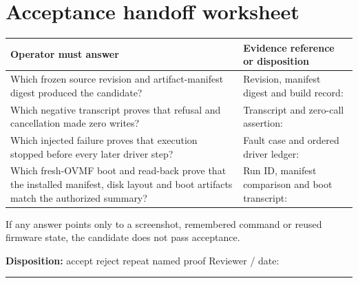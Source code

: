 \section{Acceptance handoff worksheet}
\begin{tabularx}{\linewidth}{@{}p{.40\linewidth}L@{}}
\toprule
\textbf{Operator must answer} & \textbf{Evidence reference or disposition}\\
\midrule
Which frozen source revision and artifact-manifest digest produced the candidate? & Revision, manifest digest and build record:\\[2.6em]
Which negative transcript proves that refusal and cancellation made zero writes? & Transcript and zero-call assertion:\\[2.6em]
Which injected failure proves that execution stopped before every later driver step? & Fault case and ordered driver ledger:\\[2.6em]
Which fresh-OVMF boot and read-back prove that the installed manifest, disk layout and boot artifacts match the authorized summary? & Run ID, manifest comparison and boot transcript:\\[2.6em]
\bottomrule
\end{tabularx}

If any answer points only to a screenshot, remembered command or reused
firmware state, the candidate does not pass acceptance.

\textbf{Disposition:}\quad
\fbox{\rule{0pt}{.8ex}\rule{.8ex}{0pt}} accept \qquad
\fbox{\rule{0pt}{.8ex}\rule{.8ex}{0pt}} reject \qquad
\fbox{\rule{0pt}{.8ex}\rule{.8ex}{0pt}} repeat named proof
\hfill Reviewer / date:\ \rule{3.1cm}{.4pt}


